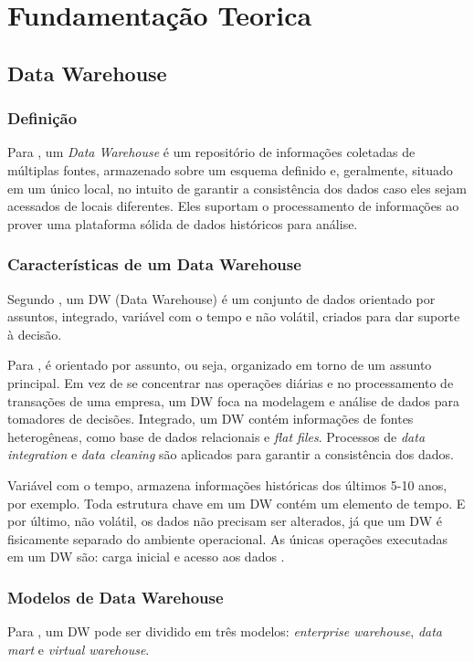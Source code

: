 \section{Fundamentação Teorica}
\subsection{Data Warehouse}
\subsubsection{Definição}
Para , um \textit{Data Warehouse} é um repositório de informações coletadas de múltiplas fontes, armazenado sobre um esquema definido e, geralmente, situado em um único local, no intuito de garantir a consistência dos dados caso eles sejam acessados de locais diferentes. Eles suportam o processamento de informações ao prover uma plataforma sólida de dados históricos para análise.

\subsubsection{Características de um Data Warehouse}
Segundo , um DW (Data Warehouse) é um conjunto de dados orientado por assuntos, integrado, variável com o tempo e não volátil, criados para dar suporte à decisão.

Para , é orientado por assunto, ou seja, organizado em torno de um assunto principal. Em vez de se concentrar nas operações diárias e no processamento de transações de uma empresa, um DW foca na modelagem e análise de dados para tomadores de decisões. 
Integrado, um DW contém informações de fontes heterogêneas, como base de dados relacionais e \textit{flat files}. Processos de \textit{data integration} e \textit{data cleaning} são aplicados para garantir a consistência dos dados.

Variável com o tempo, armazena informações históricas dos últimos 5-10 anos, por exemplo. Toda estrutura chave em um DW contém um elemento de tempo.
E por último, não volátil, os dados não precisam ser alterados, já que um DW é fisicamente separado do ambiente operacional. As únicas operações executadas em um DW são: carga inicial e acesso aos dados \citep{jmj}.

\subsubsection{Modelos de Data Warehouse}
Para , um DW pode ser dividido em três modelos: \textit{enterprise warehouse}, \textit{data mart} e \textit{virtual warehouse}.

